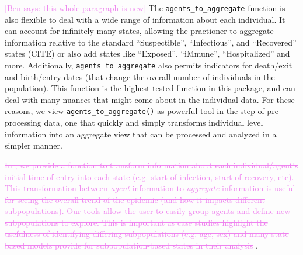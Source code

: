 \documentclass[
  shortnames]{jss}
\begin{document}
\textcolor{violet}{[Ben says: this whole paragraph is new]} The
\texttt{agents\_to\_aggregate} function is also flexible to deal with a
wide range of information about each individual. It can account for
infinitely many states, allowing the practioner to aggregate information
relative to the standard ``Suspectible'', ``Infectious'', and
``Recovered'' states (CITE) or also add states like ``Exposed'',
``iMmune'', ``Hospitalized'' and more. Additionally,
\texttt{agents\_to\_aggregate} also permits indicators for death/exit
and birth/entry dates (that change the overall number of individuals in
the population). This function is the highest tested function in this
package, and can deal with many nuances that might come-about in the
individual data. For these reasons, we view
\texttt{agents\_to\_aggregate()} as powerful tool in the step of
pre-processing data, one that quickly and simply transforms individual
level information into an aggregate view that can be processed and
analyzed in a simpler manner.

\textcolor{violet}{\sout{In , we provide a function to transform information about each individual/agent’s initial time of entry into each state (e.g. start of infection, start of recovery, etc). This transformation between \textit{agent} information to \textit{aggregate} information is useful for seeing the overall trend of the epidemic (and how it impacts different subpopulations). Our tools allow the user to easily group agents and define new subpopulations to explore. This is important as case studies highlight the usefulness of identifying differing subpopulations (e.g. age, sex) and many state based models provide for subpopulation-based states in their analysis}}
\citep{rvachev1985,anderson1992,worby2015}.
\end{document}
